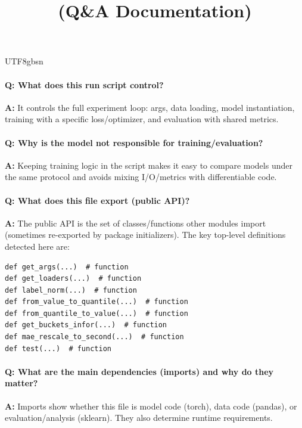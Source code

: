 \documentclass[11pt]{article}
\title{\texttt{\detokenize{run_d2q.py}} (Q\&A Documentation)}
\author{}
\date{}
\begin{document}
\begin{CJK*}{UTF8}{gbsn}
\maketitle

\paragraph{Q: What does this run script control?}
\textbf{A:} It controls the full experiment loop: args, data loading, model instantiation, training with a specific loss/optimizer, and evaluation with shared metrics.

\paragraph{Q: Why is the model not responsible for training/evaluation?}
\textbf{A:} Keeping training logic in the script makes it easy to compare models under the same protocol and avoids mixing I/O/metrics with differentiable code.

\paragraph{Q: What does this file export (public API)?}
\textbf{A:} The public API is the set of classes/functions other modules import (sometimes re-exported by package initializers). The key top-level definitions detected here are:

\begin{Verbatim}[fontsize=\small]
def get_args(...)  # function
def get_loaders(...)  # function
def label_norm(...)  # function
def from_value_to_quantile(...)  # function
def from_quantile_to_value(...)  # function
def get_buckets_infor(...)  # function
def mae_rescale_to_second(...)  # function
def test(...)  # function
\end{Verbatim}

\paragraph{Q: What are the main dependencies (imports) and why do they matter?}
\textbf{A:} Imports show whether this file is model code (torch), data code (pandas), or evaluation/analysis (sklearn). They also determine runtime requirements.

\vspace{1mm}



\end{CJK*}
\end{document}
